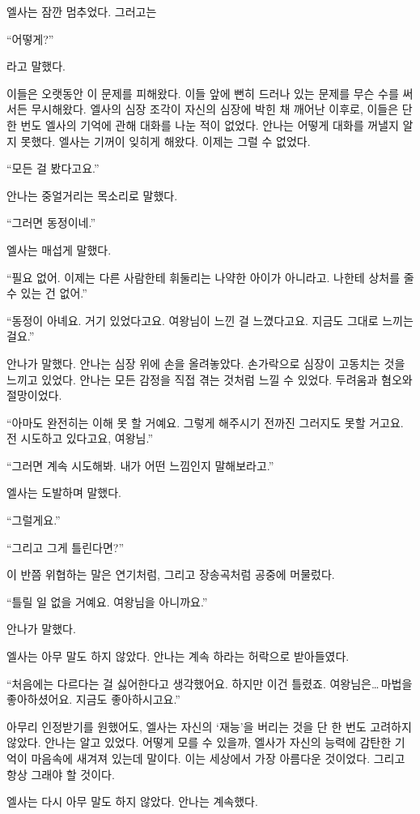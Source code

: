 엘사는 잠깐 멈추었다. 그러고는

``어떻게?''

라고 말했다.

이들은 오랫동안 이 문제를 피해왔다. 이들 앞에 뻔히 드러나 있는 문제를 무슨 수를 써서든 무시해왔다. 엘사의 심장 조각이 자신의 심장에 박힌 채 깨어난 이후로, 이들은 단 한 번도 엘사의 기억에 관해 대화를 나눈 적이 없었다. 안나는 어떻게 대화를 꺼낼지 알지 못했다. 엘사는 기꺼이 잊히게 해왔다. 이제는 그럴 수 없었다.

``모든 걸 봤다고요.''

안나는 중얼거리는 목소리로 말했다.

``그러면 동정이네.''

엘사는 매섭게 말했다.

``필요 없어. 이제는 다른 사람한테 휘둘리는 나약한 아이가 아니라고. 나한테 상처를 줄 수 있는 건 없어.''

``동정이 아녜요. 거기 있었다고요. 여왕님이 느낀 걸 느꼈다고요. 지금도 그대로 느끼는걸요.''

안나가 말했다. 안나는 심장 위에 손을 올려놓았다. 손가락으로 심장이 고동치는 것을 느끼고 있었다. 안나는 모든 감정을 직접 겪는 것처럼 느낄 수 있었다. 두려움과 혐오와 절망이었다.

``아마도 완전히는 이해 못 할 거예요. 그렇게 해주시기 전까진 그러지도 못할 거고요. 전 시도하고 있다고요, 여왕님.''

``그러면 계속 시도해봐. 내가 어떤 느낌인지 말해보라고.''

엘사는 도발하며 말했다.

``그럴게요.''

``그리고 그게 틀린다면?''

이 반쯤 위협하는 말은 연기처럼, 그리고 장송곡처럼 공중에 머물렀다.

``틀릴 일 없을 거예요. 여왕님을 아니까요.''

안나가 말했다.

엘사는 아무 말도 하지 않았다. 안나는 계속 하라는 허락으로 받아들였다.

``처음에는 다르다는 걸 싫어한다고 생각했어요. 하지만 이건 틀렸죠. 여왕님은\ldots\,마법을 좋아하셨어요. 지금도 좋아하시고요.''

아무리 인정받기를 원했어도, 엘사는 자신의 `재능'을 버리는 것을 단 한 번도 고려하지 않았다. 안나는 알고 있었다. 어떻게 모를 수 있을까, 엘사가 자신의 능력에 감탄한 기억이 마음속에 새겨져 있는데 말이다. 이는 세상에서 가장 아름다운 것이었다. 그리고 항상 그래야 할 것이다.

엘사는 다시 아무 말도 하지 않았다. 안나는 계속했다.

